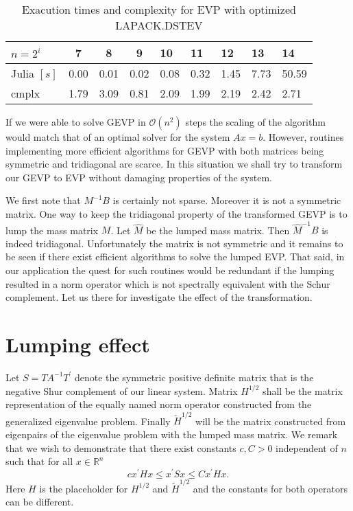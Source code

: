 \documentclass[10pt, a4paper]{article}
\newcommand{\reals}{\mathbb{R}}
\newcommand{\dual}[1]{\ensuremath{{#1}^{\prime}}}
\begin{document}
\begin{table}[ht]
\caption{Exacution times and complexity for EVP with optimized LAPACK.DSTEV}
\label{tab:eig_scale_std}
\footnotesize{
\begin{tabular}{l|SSSLLLPP}
$n=2^i$                 &    7 &    8 &    9 &   10 &   11 & 12     & 13      & 14\\
\hline
Julia $\left[s\right]$ & 0.00 & 0.01 & 0.02 & 0.08 & 0.32 & 1.45 & 7.73 & 50.59\\
cmplx                  & 1.79 & 3.09 & 0.81 & 2.09 & 1.99 & 2.19 & 2.42 & 2.71\\
\end{tabular}
}
\end{table}
%

If we were able to solve GEVP in $\mathcal{O}(n^2)$ steps the scaling of the
algorithm would match that of an optimal solver for the system $Ax=b$. However,
routines implementing more efficient algorithms for GEVP with both matrices
being symmetric and tridiagonal are scarce. In this situation we shall try to
transform our GEVP to EVP without damaging properties of the system. 

We first note that $M^{-1} B$ is certainly not sparse. Moreover it is not a symmetric 
matrix. One way to keep the tridiagonal property of the transformed GEVP is to lump 
the mass matrix $M$. Let $\hat{M}$ be the lumped mass matrix. Then $\hat{M}^{-1} B$ 
is indeed tridiagonal. Unfortunately the matrix is not symmetric and it remains to 
be seen if there exist efficient algorithms to solve the lumped EVP. That said,
in our application the quest for such routines would be redundant if the lumping
resulted in a norm operator which is not spectrally equivalent with the Schur
complement. Let us there for investigate the effect of the transformation.

\section*{Lumping effect}
Let $S=TA^{-1}\dual{T}$ denote the symmetric positive definite matrix that is the
negative Shur complement of our linear system. Matrix $H^{1/2}$ shall be the
matrix representation of the equally named norm operator constructed from the
generalized eigenvalue problem. Finally $\tilde{H}^{1/2}$ will be the matrix 
constructed from eigenpairs of the eigenvalue problem with the lumped mass
matrix. We remark that we wish to demonstrate that there exist constants $c, C>0$
independent of $n$ such that for all $x\in\reals^n$
%
\begin{equation}\label{eq:equiv}
  c\dual{x} H x \leq \dual{x} S x \leq  C\dual{x} H x.
\end{equation}
Here $H$ is the placeholder for $H^{1/2}$ and $\tilde{H}^{1/2}$ and the
constants for both operators can be different.
\end{document}
